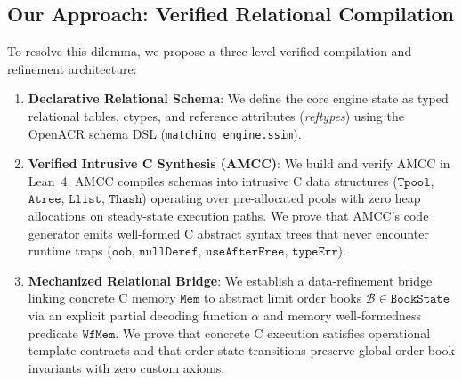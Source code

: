 \documentclass[11pt,a4paper]{article}
\begin{document}
\subsection{Our Approach: Verified Relational Compilation}

To resolve this dilemma, we propose a three-level verified compilation and refinement architecture:
\begin{enumerate}[leftmargin=*]
    \item \textbf{Declarative Relational Schema}: We define the core engine state as typed relational tables, ctypes, and reference attributes (\emph{reftypes}) using the OpenACR schema DSL (\texttt{matching\_engine.ssim}).
    \item \textbf{Verified Intrusive C Synthesis (AMCC)}: We build and verify AMCC in Lean~4. AMCC compiles schemas into intrusive C data structures ($\mathtt{Tpool}$, $\mathtt{Atree}$, $\mathtt{Llist}$, $\mathtt{Thash}$) operating over pre-allocated pools with zero heap allocations on steady-state execution paths. We prove that AMCC's code generator emits well-formed C abstract syntax trees that never encounter runtime traps ($\mathtt{oob}$, $\mathtt{nullDeref}$, $\mathtt{useAfterFree}$, $\mathtt{typeErr}$).
    \item \textbf{Mechanized Relational Bridge}: We establish a data-refinement bridge linking concrete C memory $\mathtt{Mem}$ to abstract limit order books $\mathcal{B} \in \mathtt{BookState}$ via an explicit partial decoding function $\alpha$ and memory well-formedness predicate $\mathtt{WfMem}$. We prove that concrete C execution satisfies operational template contracts and that order state transitions preserve global order book invariants with zero custom axioms.
\end{enumerate}
\end{document}
